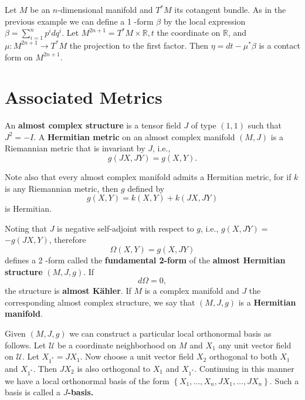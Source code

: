 \begin{example}
    Let $M$ be an $n$-dimensional manifold and $T^* M$ its cotangent bundle. As in the previous example we can define a 1 -form $\beta$ by the local expression $\beta=\sum_{i=1}^n p^i d q^i$. Let $M^{2 n+1}=T^* M \times \mathbb{R}, t$ the coordinate on $\mathbb{R}$, and $\mu: M^{2 n+1} \longrightarrow T^* M$ the projection to the first factor. Then $\eta=d t-\mu^* \beta$ is a contact form on $M^{2 n+1}$.
\end{example}

\section{Associated Metrics}
\begin{definition}
    An \textbf{almost complex structure} is a tensor field $J$ of type $(1,1)$ such that $J^2=-I$. A \textbf{Hermitian metric} on an almost complex manifold $(M, J)$ is a Riemannian metric that is invariant by $J$, i.e.,
    \begin{equation}
        g(J X, J Y)=g(X, Y).
    \end{equation}
    \end{definition}

    \begin{remark}
        Note also that every almost complex manifold admits a Hermitian metric, for if $k$ is any Riemannian metric, then $g$ defined by
        \begin{equation}
            g(X, Y)=k(X, Y)+k(J X, J Y)
        \end{equation}
is Hermitian.
    \end{remark}
    
    \begin{definition}
    Noting that $J$ is negative self-adjoint with respect to $g$, i.e., $g(X, J Y)=$ $-g(J X, Y)$, therefore 
    \begin{equation}
         \Omega(X, Y)=g(X, J Y)
    \end{equation}
    defines a 2 -form called the\textbf{ fundamental 2-form} of the \textbf{almost Hermitian structure} $(M, J, g)$. If 
    \begin{equation}
            d \Omega= 0,
    \end{equation}
 the structure is \textbf{almost Kähler}. If $M$ is a complex manifold and $J$ the corresponding almost complex structure, we say that $(M, J, g)$ is a \textbf{Hermitian manifold}.
\end{definition}
\begin{definition}
    Given $(M, J, g)$ we can construct a particular local orthonormal basis as follows. Let $\mathcal{U}$ be a coordinate neighborhood on $M$ and $X_1$ any unit vector field on $\mathcal{U}$. Let $X_{1^*}=J X_1$. Now choose a unit vector field $X_2$ orthogonal to both $X_1$ and $X_{1^*}$. Then $J X_2$ is also orthogonal to $X_1$ and $X_{1^*}$. Continuing in this manner we have a local orthonormal basis of the form $\left\{X_1, \ldots, X_n, J X_1, \ldots, J X_n\right\}$. Such a basis is called a \textbf{$J$-basis.} 
\end{definition}


